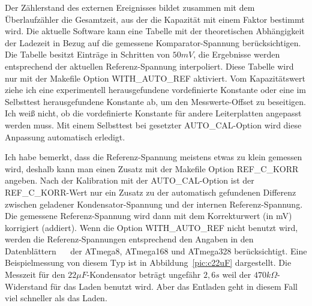 Der Zählerstand des externen Ereignisses bildet zusammen mit dem Überlaufzähler die Gesamtzeit, aus der die
Kapazität mit einem Faktor bestimmt wird.
Die aktuelle Software kann eine Tabelle mit der theoretischen Abhängigkeit der Ladezeit in Bezug auf die gemessene
Komparator-Spannung berücksichtigen.
Die Tabelle besitzt Einträge in Schritten von \(50mV\), die Ergebnisse werden entsprechend der aktuellen Referenz-Spannung interpoliert.
Diese Tabelle wird nur mit der Makefile Option WITH\_AUTO\_REF aktiviert.
Vom Kapazitätswert ziehe ich eine experimentell herausgefundene vordefinierte Konstante oder eine im Selbsttest
herausgefundene Konstante ab, um den Messwerte-Offset zu beseitigen.
Ich weiß nicht, ob die vordefinierte Konstante für andere Leiterplatten angepasst werden muss.
Mit einem Selbsttest bei gesetzter AUTO\_CAL-Option wird diese Anpassung automatisch erledigt.

Ich habe bemerkt, dass die Referenz-Spannung meistens etwas zu klein gemessen wird,
 deshalb kann man einen Zusatz mit der Makefile Option REF\_C\_KORR angeben.
Nach der Kalibration mit der AUTO\_CAL-Option ist der REF\_C\_KORR-Wert nur ein Zusatz zu der automatisch
gefundenen Differenz zwischen geladener Kondensator-Spannung und der internen Referenz-Spannung.
Die gemessene Referenz-Spannung wird dann mit dem Korrekturwert (in mV) korrigiert (addiert).
Wenn die Option WITH\_AUTO\_REF nicht benutzt wird, werden die Referenz-Spannungen entsprechend den Angaben in den
Datenblättern ~\cite{ATmega8}~\cite{ATmega168} der ATmega8, ATmega168 und ATmega328 berücksichtigt.
Eine Beispielmessung von diesem Typ ist in Abbildung~\ref{pic:c22uF} dargestellt.
Die Messzeit für den \(22\mu F\)-Kondensator beträgt ungefähr \(2,6s\) weil der \(470k\Omega\)-Widerstand für das Laden benutzt wird.
Aber das Entladen geht in diesem Fall viel schneller als das Laden.

